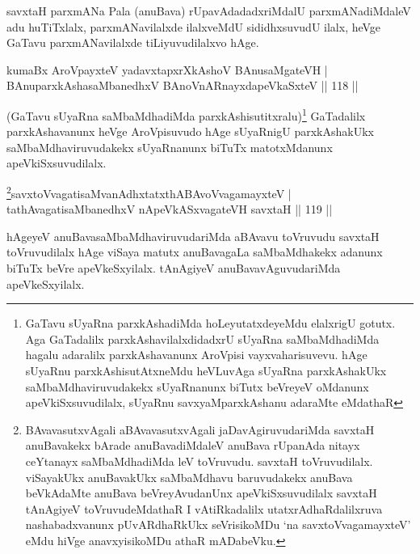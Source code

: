 \begin{artha}%
savxtaH parxmANa Pala (anuBava) rUpavAdadadxriMdalU parxmANadiMdaleV adu huTiTxlalx, parxmANavilalxde ilalxveMdU sididhxsuvudU ilalx, heVge GaTavu parxmANavilalxde tiLiyuvudilalxvo hAge.
\end{artha}


\begin{shl}
kumaBx AroVpayxteV yadavxtapxrXkAshoV BAnusaMgateVH |\\
BAnuparxkAshasaMbanedhxV BAnoVnARnayxdapeVkaSxteV \hfill || 118 ||
\end{shl}

\begin{artha}
(GaTavu sUyaRna saMbaMdhadiMda parxkAshisutitxralu)\footnote{GaTavu sUyaRna parxkAshadiMda hoLeyutatxdeyeMdu elalxrigU gotutx. Aga GaTadalilx parxkAshavilalxdidadxrU sUyaRna saMbaMdhadiMda hagalu adaralilx parxkAshavanunx AroVpisi vayxvaharisuvevu. hAge sUyaRnu parxkAshisutAtxneMdu heVLuvAga sUyaRna parxkAshakUkx saMbaMdhaviruvudakekx sUyaRnanunx biTutx beVreyeV oMdanunx apeVkiSxsuvudilalx, sUyaRnu savxyaMparxkAshanu adaraMte eMdathaR} GaTadalilx parxkAshavanunx heVge AroVpisuvudo hAge sUyaRnigU parxkAshakUkx saMbaMdhaviruvudakekx sUyaRnanunx biTuTx matotxMdanunx apeVkiSxsuvudilalx.
\end{artha}

\begin{shl}
\footnote{BAvavasutxvAgali aBAvavasutxvAgali jaDavAgiruvudariMda savxtaH anuBavakekx bArade anuBavadiMdaleV anuBava rUpanAda nitayx ceYtanayx saMbaMdhadiMda leV toVruvudu. savxtaH toVruvudilalx. viSayakUkx anuBavakUkx saMbaMdhavu baruvudakekx anuBava beVkAdaMte anuBava beVreyAvudanUnx apeVkiSxsuvudilalx savxtaH tAnAgiyeV toVruvudeMdathaR I vAtiRkadalilx utatxrAdhaRdalilxruva nashabadxvanunx pUvARdhaRkUkx seVrisikoMDu `na savxtoV\s vagamayxteV' eMdu hiVge anavxyisikoMDu athaR mADabeVku.}savxtoV\s vagatisaMvanAdhxtatxthA\s BAvoV\s vagamayxteV |\\
tathA\s vagatisaMbanedhxV nApeVkASx\s vagateVH savxtaH \hfill || 119 ||
\end{shl}

\begin{artha}
hAgeyeV anuBavasaMbaMdhaviruvudariMda aBAvavu toVruvudu savxtaH toVruvudilalx hAge viSaya matutx anuBavagaLa saMbaMdhakekx adanunx biTuTx beVre apeVkeSxyilalx. tAnAgiyeV anuBavavAguvudariMda apeVkeSxyilalx.
\end{artha}

